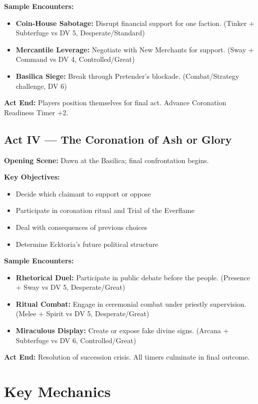 \documentclass[11pt]{article}
\begin{document}
\textbf{Sample Encounters:}
\begin{itemize}
\item \textbf{Coin-House Sabotage:} Disrupt financial support for one faction. (Tinker + Subterfuge vs DV 5, Desperate/Standard)
\item \textbf{Mercantile Leverage:} Negotiate with New Merchants for support. (Sway + Command vs DV 4, Controlled/Great)
\item \textbf{Basilica Siege:} Break through Pretender's blockade. (Combat/Strategy challenge, DV 6)
\end{itemize}

\textbf{Act End:} Players position themselves for final act. Advance Coronation Readiness Timer +2.

\subsection{Act IV --- The Coronation of Ash or Glory}

\textbf{Opening Scene:} Dawn at the Basilica; final confrontation begins.

\textbf{Key Objectives:}
\begin{itemize}
\item Decide which claimant to support or oppose
\item Participate in coronation ritual and Trial of the Everflame
\item Deal with consequences of previous choices
\item Determine Ecktoria's future political structure
\end{itemize}

\textbf{Sample Encounters:}
\begin{itemize}
\item \textbf{Rhetorical Duel:} Participate in public debate before the people. (Presence + Sway vs DV 5, Desperate/Great)
\item \textbf{Ritual Combat:} Engage in ceremonial combat under priestly supervision. (Melee + Spirit vs DV 5, Desperate/Great)
\item \textbf{Miraculous Display:} Create or expose fake divine signs. (Arcana + Subterfuge vs DV 6, Controlled/Great)
\end{itemize}

\textbf{Act End:} Resolution of succession crisis. All timers culminate in final outcome.

\section{Key Mechanics}
\end{document}
